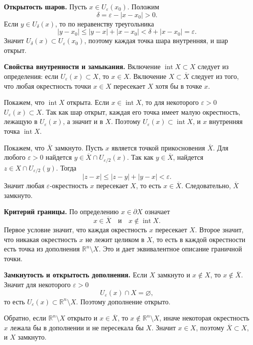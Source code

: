 \documentclass[12pt,a4paper]{article}
\newcommand{\R}{\mathbb{R}}
\newcommand{\eps}{\varepsilon}
\newcommand{\Ball}[2]{U_{#1}(#2)}
\begin{document}
\textbf{Открытость шаров.}
Пусть \(x\in\Ball{\eps}{x_0}\). Положим
\[
  \delta=\eps-|x-x_0|>0.
\]
Если \(y\in\Ball{\delta}{x}\), то по неравенству треугольника
\[
  |y-x_0|\le |y-x|+|x-x_0|<\delta+|x-x_0|=\eps.
\]
Значит \(\Ball{\delta}{x}\subset\Ball{\eps}{x_0}\), поэтому каждая точка шара
внутренняя, и шар открыт.

\textbf{Свойства внутренности и замыкания.}
Включение \(\operatorname{int}X\subset X\) следует из определения: если
\(\Ball{\eps}{x}\subset X\), то \(x\in X\). Включение \(X\subset\overline X\)
следует из того, что любая окрестность точки \(x\in X\) пересекает \(X\) хотя
бы в точке \(x\).

Покажем, что \(\operatorname{int}X\) открыта. Если
\(x\in\operatorname{int}X\), то для некоторого \(\eps>0\)
\(\Ball{\eps}{x}\subset X\). Так как шар открыт, каждая его точка имеет малую
окрестность, лежащую в \(\Ball{\eps}{x}\), а значит и в \(X\). Поэтому
\(\Ball{\eps}{x}\subset \operatorname{int}X\), и \(x\) внутренняя точка
\(\operatorname{int}X\).

Покажем, что \(\overline X\) замкнуто. Пусть \(x\) является точкой
прикосновения \(\overline X\). Для любого \(\eps>0\) найдется
\(y\in\overline X\cap \Ball{\eps/2}{x}\). Так как \(y\in\overline X\), найдется
\(z\in X\cap\Ball{\eps/2}{y}\). Тогда
\[
  |z-x|\le |z-y|+|y-x|<\eps.
\]
Значит любая \(\eps\)-окрестность \(x\) пересекает \(X\), то есть
\(x\in\overline X\). Следовательно, \(\overline X\) замкнуто.

\textbf{Критерий границы.}
По определению \(x\in\partial X\) означает
\[
  x\in\overline X
  \quad\text{и}\quad
  x\notin\operatorname{int}X.
\]
Первое условие значит, что каждая окрестность \(x\) пересекает \(X\). Второе
значит, что никакая окрестность \(x\) не лежит целиком в \(X\), то есть в
каждой окрестности есть точка из дополнения \(\R^n\setminus X\). Это и дает
эквивалентное описание граничной точки.

\textbf{Замкнутость и открытость дополнения.}
Если \(X\) замкнуто и \(x\notin X\), то \(x\notin\overline X\). Значит для
некоторого \(\eps>0\)
\[
  \Ball{\eps}{x}\cap X=\varnothing,
\]
то есть \(\Ball{\eps}{x}\subset\R^n\setminus X\). Поэтому дополнение открыто.

Обратно, если \(\R^n\setminus X\) открыто и \(x\in\overline X\), то \(x\notin
\R^n\setminus X\), иначе некоторая окрестность \(x\) лежала бы в дополнении и
не пересекала бы \(X\). Значит \(x\in X\), поэтому \(\overline X\subset X\),
и \(X\) замкнуто.
\end{document}

